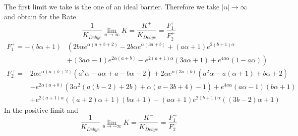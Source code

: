 The first limit we take is the one of an ideal barrier. Therefore we take $|u| \rightarrow \infty$ and obtain for the Rate
\begin{equation}
    \frac{1}{K_{Debye}}\lim_{u \rightarrow \infty}K = \frac{K^{+}}{K_{Debye}} = \frac{F_{1}^{+}}{F_{2}^{+}}
    \label{K+}
\end{equation}
\begin{align*}
    F_{1}^{+} = -(b \alpha+1)  & \left( 2 b \alpha e^{\alpha (a+b+2)}-2 b \alpha e^{\alpha (3 a+b)}+(a \alpha+1) e^{2 (b+1) \alpha} \right. \\
                                & \left.+(3 a \alpha-1) e^{2 \alpha (a+b)} -e^{2 (a+1) \alpha} (3 a \alpha+1)+e^{4 a \alpha} (1-a \alpha) \right)
\end{align*}
\begin{align*}
    F_{2}^{+} = & 2 \alpha e^{\alpha (a+b+2)} \left(a^2 \alpha-a \alpha+a-b \alpha-2\right)+2 \alpha e^{\alpha (3 a+b)} \left(a^2 \alpha-a (\alpha+1)+b \alpha+2\right) \\
                &-e^{2 \alpha (a+b)} \left(3 \alpha^2 (a (b-2)+2 b)+\alpha (a-3 b+4)-1\right)+e^{4 a \alpha} (a \alpha-1) (b \alpha+1) \\
                &+e^{2 (a+1) \alpha} ((a+2) \alpha+1) (b \alpha+1)-(a \alpha+1) e^{2 (b+1) \alpha} ((3 b-2) \alpha+1)
\end{align*}
In the positive limit and 
\begin{equation}
    \frac{1}{K_{Debye}} \lim_{u \rightarrow -\infty}K = \frac{K^{-}}{K_{Debye}} =  \frac{F_{1}^{-}}{F_{2}^{-}}
        \label{K-}
\end{equation}

